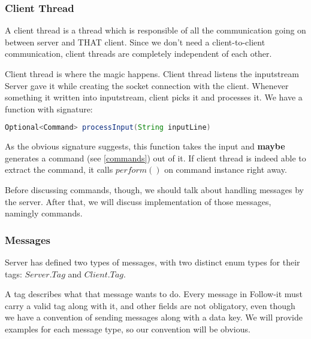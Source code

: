 \documentclass{article}
\begin{document}
\subsubsection{Client Thread}
\label{client_thread}
\par A client thread is a thread which is responsible of all the communication going on between server and THAT client. Since we don't need a client-to-client communication, client threads are completely independent of each other.

\par Client thread is where the magic happens. Client thread listens the inputstream Server gave it while creating the socket connection with the client. Whenever something it written into inputstream, client picks it and processes it. We have a function with signature:
\begin{lstlisting}[firstline=1, language=Java]
Optional<Command> processInput(String inputLine)
\end{lstlisting}
\par As the obvious signature suggests, this function takes the input and \textbf{maybe} generates a command (see \ref{commands}) out of it. If client thread is indeed able to extract the command, it calls $perform()$ on command instance right away. 

\par Before discussing commands, though, we should talk about handling messages by the server. After that, we will discuss implementation of those messages, namingly commands.

\newpage
\subsubsection{Messages}
\label{messages}
Server has defined two types of messages, with two distinct enum types for their tags: $Server.Tag$ and $Client.Tag$.

\par A tag describes what that message wants to do. Every message in Follow-it must carry a valid tag along with it, and other fields are not obligatory, even though we have a convention of sending messages along with a data key. We will provide examples for each message type, so our convention will be obvious.\\
\end{document}
